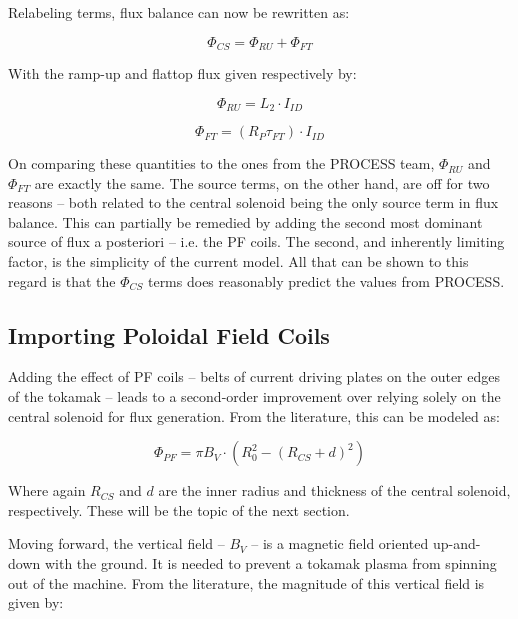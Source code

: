 Relabeling terms, flux balance can now be rewritten as:

\begin{equation}
	\Phi_{CS} = \Phi_{RU} + \Phi_{FT}
\end{equation}

With the ramp-up and flattop flux given respectively by:

\begin{equation}
	\label{eq:phiru}
	\Phi_{RU} = L_2 \cdot I_{ID}
\end{equation}

\begin{equation}
	\label{eq:phift}
	\Phi_{FT} = ( R_P \tau_{FT} ) \cdot I_{ID}
\end{equation}

On comparing these quantities to the ones from the PROCESS team, $\Phi_{RU}$ and $\Phi_{FT}$ are exactly the same. The source terms, on the other hand, are off for two reasons -- both related to the central solenoid being the only source term in flux balance. This can partially be remedied by adding the second most dominant source of flux a posteriori -- i.e. the PF coils. The second, and inherently limiting factor, is the simplicity of the current model. All that can be shown to this regard is that the $\Phi_{CS}$ terms does reasonably predict the values from PROCESS.

\subsection{Importing Poloidal Field Coils}

Adding the effect of PF coils -- belts of current driving plates on the outer edges of the tokamak -- leads to a second-order improvement over relying solely on the central solenoid for flux generation. From the literature, this can be modeled as: \cite{hartmann}

\begin{equation}
	\label{eq:phipf}
	\Phi_{PF} = \pi B_V \cdot \left( R_0^2 - ( R_{CS} + d ) ^ 2 \right)
\end{equation}

Where again $R_{CS}$ and $d$ are the inner radius and thickness of the central solenoid, respectively. These will be the topic of the next section.

Moving forward, the vertical field -- $B_V$ -- is a magnetic field oriented up-and-down with the ground. It is needed to prevent a tokamak plasma from spinning out of the machine. From the literature, the magnitude of this vertical field is given by: \cite{process}

